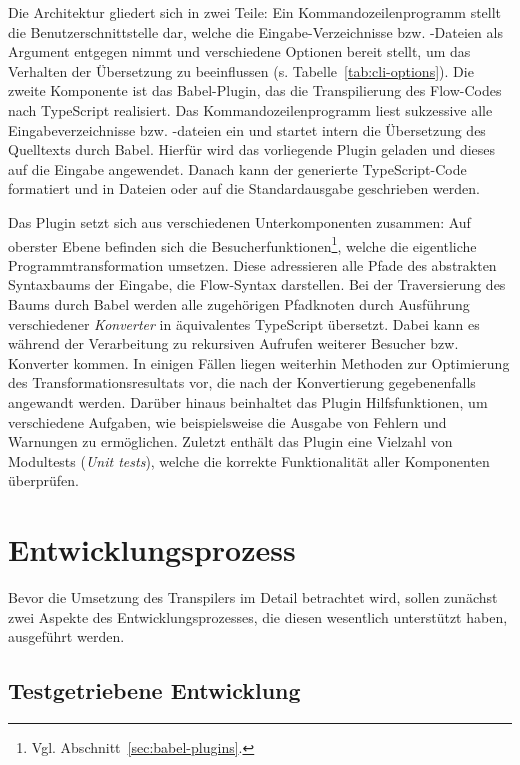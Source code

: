 Die Architektur gliedert sich in zwei Teile: Ein Kommandozeilenprogramm stellt die Benutzerschnittstelle dar, welche die Eingabe-Verzeichnisse bzw. -Dateien als Argument entgegen nimmt und verschiedene Optionen bereit stellt, um das Verhalten der Übersetzung zu beeinflussen (s. Tabelle~\ref{tab:cli-options}). Die zweite Komponente ist das Babel-Plugin, das die Transpilierung des Flow-Codes nach TypeScript realisiert. Das Kommandozeilenprogramm liest sukzessive alle Eingabeverzeichnisse bzw. -dateien ein und startet intern die Übersetzung des Quelltexts durch Babel. Hierfür wird das vorliegende Plugin geladen und dieses auf die Eingabe angewendet. Danach kann der generierte TypeScript-Code formatiert und in Dateien oder auf die Standardausgabe geschrieben werden.

Das Plugin setzt sich aus verschiedenen Unterkomponenten zusammen: Auf oberster Ebene befinden sich die Besucherfunktionen\footnote{Vgl. Abschnitt~\ref{sec:babel-plugins}.}, welche die eigentliche Programmtransformation umsetzen. Diese adressieren alle Pfade des abstrakten Syntaxbaums der Eingabe, die Flow-Syntax darstellen. Bei der Traversierung des Baums durch Babel werden alle zugehörigen Pfadknoten durch Ausführung verschiedener \emph{Konverter} in äquivalentes TypeScript übersetzt. Dabei kann es während der Verarbeitung zu rekursiven Aufrufen weiterer Besucher bzw. Konverter kommen. In einigen Fällen liegen weiterhin Methoden zur Optimierung des Transformationsresultats vor, die nach der Konvertierung gegebenenfalls angewandt werden. Darüber hinaus beinhaltet das Plugin Hilfsfunktionen, um verschiedene Aufgaben, wie beispielsweise die Ausgabe von Fehlern und Warnungen zu ermöglichen. Zuletzt enthält das Plugin eine Vielzahl von Modultests (\textit{Unit tests}), welche die korrekte Funktionalität aller Komponenten überprüfen.

\section{Entwicklungsprozess}

Bevor die Umsetzung des Transpilers im Detail betrachtet wird, sollen zunächst zwei Aspekte des Entwicklungsprozesses, die diesen wesentlich unterstützt haben, ausgeführt werden.

\subsection{Testgetriebene Entwicklung}
\label{sec:tdd}

